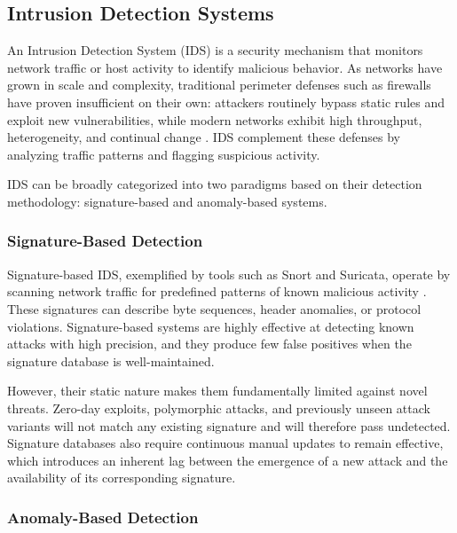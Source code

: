 \subsection{Intrusion Detection Systems}
\label{sec:ids}

\par An Intrusion Detection System (IDS) is a security mechanism that monitors network traffic or host activity to identify malicious behavior. As networks have grown in scale and complexity, traditional perimeter defenses such as firewalls have proven insufficient on their own: attackers routinely bypass static rules and exploit new vulnerabilities, while modern networks exhibit high throughput, heterogeneity, and continual change \cite{Lansky2021}. IDS complement these defenses by analyzing traffic patterns and flagging suspicious activity.

\par IDS can be broadly categorized into two paradigms based on their detection methodology: signature-based and anomaly-based systems.

\subsubsection{Signature-Based Detection}
\label{subsec:signature_ids}

\par Signature-based IDS, exemplified by tools such as Snort and Suricata, operate by scanning network traffic for predefined patterns of known malicious activity \cite{Roesch1999}. These signatures can describe byte sequences, header anomalies, or protocol violations. Signature-based systems are highly effective at detecting known attacks with high precision, and they produce few false positives when the signature database is well-maintained.

\par However, their static nature makes them fundamentally limited against novel threats. Zero-day exploits, polymorphic attacks, and previously unseen attack variants will not match any existing signature and will therefore pass undetected. Signature databases also require continuous manual updates to remain effective, which introduces an inherent lag between the emergence of a new attack and the availability of its corresponding signature.

\subsubsection{Anomaly-Based Detection}
\label{subsec:anomaly_ids}

